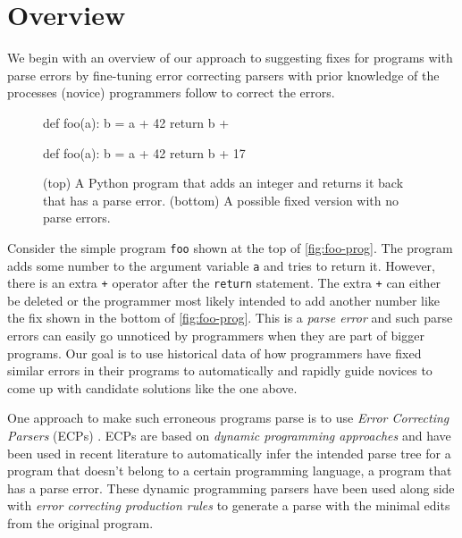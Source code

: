 \section{Overview}
\label{sec:overview}

We begin with an overview of our approach to suggesting fixes for programs with
parse errors by fine-tuning error correcting parsers with prior knowledge of the
processes (novice) programmers follow to correct the errors.

\begin{figure}[ht]
\begin{ecode}
def foo(a):
  b = a + 42
  return b +
\end{ecode}

\begin{ecode}
def foo(a):
  b = a + 42
  return b + 17
\end{ecode}
\caption{(top) A Python program that adds an integer and returns it back that
has a parse error. (bottom) A possible fixed version with no parse errors.}
\label{fig:foo-prog}
\end{figure}


 Consider the simple program \texttt{foo} shown at the top
of \autoref{fig:foo-prog}. The program adds some number to the argument variable
\texttt{a} and tries to return it. However, there is an extra \texttt{+}
operator after the \texttt{return} statement. The extra \texttt{+} can either be
deleted or the programmer most likely intended to add another number like the
fix shown in the bottom of \autoref{fig:foo-prog}. This is a \emph{parse error}
and such parse errors can easily go unnoticed \citep{?} by programmers when they
are part of bigger programs.
%
Our goal is to use historical data of how programmers have fixed similar errors
in their programs to automatically and rapidly guide novices to come up with
candidate solutions like the one above.


One approach to make such erroneous programs parse is to use \emph{Error
Correcting Parsers} (ECPs) \citep{?}. ECPs are based on \emph{dynamic
programming approaches} and have been used in recent literature to automatically
infer the intended parse tree for a program that doesn't belong to a certain
programming language, \ie a program that has a parse error. These dynamic
programming parsers have been used along side with \emph{error correcting
production rules} \citep{?} to generate a parse with the minimal edits from the
original program.


